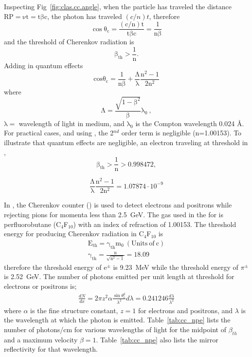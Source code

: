 Inspecting Fig~\ref{fig:clas.cc.angle}, when the particle has traveled the distance $\mathrm{RP =\nu t = t \beta c}$, the photon has traveled $(c/n)t$, therefore
\begin{equation}\label{eq:cherenkov_eq}
 \mathrm{\cos\theta_{c} = \frac{(c/n)t}{t \beta c} = \frac{1}{n\beta}}
\end{equation}
and the threshold of Cherenkov radiation is 
\begin{equation}\label{eq:cherenkov_threshold}
 \mathrm{\beta_{th} > \frac{1}{n}}.
\end{equation}
Adding in quantum effects
\begin{equation}\label{eq:cherenkov_eq_quantum}
\mathrm{cos\theta_{c} = \frac{1}{n\beta} + \frac{\Lambda}{\lambda}\frac{n^{2} -1}{2n^{2}}}
\end{equation}
where
\begin{equation}\label{eq:cherenkov_eq_quantum_lambda}
\mathrm{\Lambda = \frac{\sqrt{1-\beta^{2}}}{\beta}\lambda_{0}} \ , 
\end{equation}
$\mathrm{\lambda =}$ wavelength of light in medium, and $\mathrm{\lambda_{0} }$ is the Compton wavelength 0.024 \AA. For practical cases, and using , the 2$^{nd}$ order term is negligible (n=1.00153). To illustrate that quantum effects are negligible, an electron traveling at threshold in  ,
\begin{equation}
\mathrm{\beta_{th} > \frac{1}{n}} > 0.998472,
\end{equation}

\begin{equation}
\mathrm{\frac{\Lambda}{\lambda}\frac{n^{2} -1}{2n^{2}} =  1.07874 \cdot 10^{-9}}
\end{equation}
%

In , the Cherenkov counter () is used to detect electrons and positrons while rejecting pions for momenta less than 2.5~GeV. The gas used in the  for  is perfluorobutane (C$_4$F$_{10}$) with an index of refraction of 1.00153. The threshold energy for producing Cherenkov radiation in C$_4$F$_{10}$ is
\begin{align}
\mathrm{E_{th} = \gamma_{th} m_{0}} \mathrm{ \ (Units \ of \ c)} \\
\mathrm{\gamma_{th} = \frac{n}{\sqrt{n^{2} -1}}} = 18.09
\end{align}
therefore the threshold energy of e$^{\pm}$ is 9.23~MeV while the threshold energy of $\pi^{\pm}$ is 2.52~GeV.
%
The number of photons emitted per unit length at threshold for electrons or positrons is;
\begin{align}\label{eq:cc.NPE}
\frac{dN}{dx} = 2\pi z^2 \alpha \frac{\sin \theta_{c}^2}{\lambda^2} d\lambda = 0.241246 \frac{d\lambda}{\lambda^2}
\end{align}
where $\alpha$ is the fine structure constant, $z =1$ for electrons and positrons, and $\lambda$ is the wavelength at which the photon is emitted. Table~\ref{tab:cc_npe} lists the number of photons/cm for various wavelengths of light for the midpoint of $\beta_{th}$ and a maximum velocity $\beta =1$. Table~\ref{tab:cc_npe} also lists the mirror reflectivity for that wavelength.


